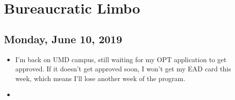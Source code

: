 \documentclass{report}
\theoremstyle{definition}
\begin{document}
\chapter{Bureaucratic Limbo}

\section{Monday, June 10, 2019}

\begin{itemize}
	\item I'm back on UMD campus, still waiting for my OPT application to get approved. If it doesn't get approved soon, I won't get my EAD card this week, which means I'll lose another week of the program.
	
	
	\item 
\end{itemize}
\end{document}
